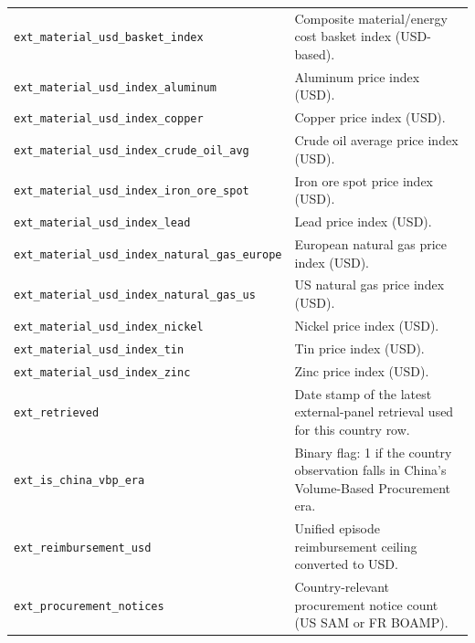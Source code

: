 \documentclass{article}
\begin{document}
\begin{longtable}{@{}p{5.4cm} p{10.6cm}@{}}
\texttt{ext\_\allowbreak material\_\allowbreak usd\_\allowbreak basket\_\allowbreak index} & Composite material/energy cost basket index (USD-based). \\
\texttt{ext\_\allowbreak material\_\allowbreak usd\_\allowbreak index\_\allowbreak aluminum} & Aluminum price index (USD). \\
\texttt{ext\_\allowbreak material\_\allowbreak usd\_\allowbreak index\_\allowbreak copper} & Copper price index (USD). \\
\texttt{ext\_\allowbreak material\_\allowbreak usd\_\allowbreak index\_\allowbreak crude\_\allowbreak oil\_\allowbreak avg} & Crude oil average price index (USD). \\
\texttt{ext\_\allowbreak material\_\allowbreak usd\_\allowbreak index\_\allowbreak iron\_\allowbreak ore\_\allowbreak spot} & Iron ore spot price index (USD). \\
\texttt{ext\_\allowbreak material\_\allowbreak usd\_\allowbreak index\_\allowbreak lead} & Lead price index (USD). \\
\texttt{ext\_\allowbreak material\_\allowbreak usd\_\allowbreak index\_\allowbreak natural\_\allowbreak gas\_\allowbreak europe} & European natural gas price index (USD). \\
\texttt{ext\_\allowbreak material\_\allowbreak usd\_\allowbreak index\_\allowbreak natural\_\allowbreak gas\_\allowbreak us} & US natural gas price index (USD). \\
\texttt{ext\_\allowbreak material\_\allowbreak usd\_\allowbreak index\_\allowbreak nickel} & Nickel price index (USD). \\
\texttt{ext\_\allowbreak material\_\allowbreak usd\_\allowbreak index\_\allowbreak tin} & Tin price index (USD). \\
\texttt{ext\_\allowbreak material\_\allowbreak usd\_\allowbreak index\_\allowbreak zinc} & Zinc price index (USD). \\
\texttt{ext\_\allowbreak retrieved} & Date stamp of the latest external-panel retrieval used for this country row. \\
\texttt{ext\_\allowbreak is\_\allowbreak china\_\allowbreak vbp\_\allowbreak era} & Binary flag: 1 if the country observation falls in China's Volume-Based Procurement era. \\
\texttt{ext\_\allowbreak reimbursement\_\allowbreak usd} & Unified episode reimbursement ceiling converted to USD. \\
\texttt{ext\_\allowbreak procurement\_\allowbreak notices} & Country-relevant procurement notice count (US SAM or FR BOAMP). \\


\end{longtable}
\end{document}
